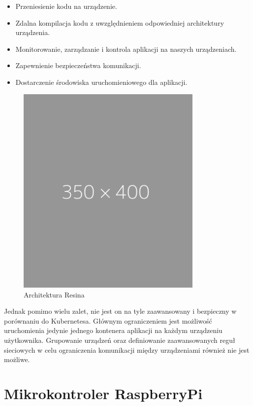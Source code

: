 \documentclass[12pt]{report}
\let\Oldsection\section
\renewcommand{\section}{\FloatBarrier\Oldsection}
\begin{document}
{\begin{itemize}
\item{Przeniesienie kodu na urządzenie.}
\item{Zdalna kompilacja kodu z uwzględnieniem odpowiedniej architektury urządzenia.}
\item{Monitorowanie, zarządzanie i kontrola aplikacji na naszych urządzeniach.}
\item{Zapewnienie bezpieczeństwa komunikacji.}
\item{Dostarczenie środowiska uruchomieniowego dla aplikacji.}
\end{itemize}

\begin{figure}[h]
	\centering
	\includegraphics[width=0.81\textwidth]{images/placeholder.png}
	\caption{Architektura Resina}
\end{figure}

Jednak pomimo wielu zalet, nie jest on na tyle zaawansowany i bezpieczny w porównaniu do Kubernetesa. Głównym ograniczeniem jest możliwość uruchomienia jedynie jednego kontenera aplikacji na każdym urządzeniu użytkownika. Grupowanie urządzeń oraz definiowanie zaawansowanych reguł sieciowych w celu ograniczenia komunikacji między urządzeniami również nie jest możliwe.

\section{Mikrokontroler RaspberryPi}

}
\end{document}
